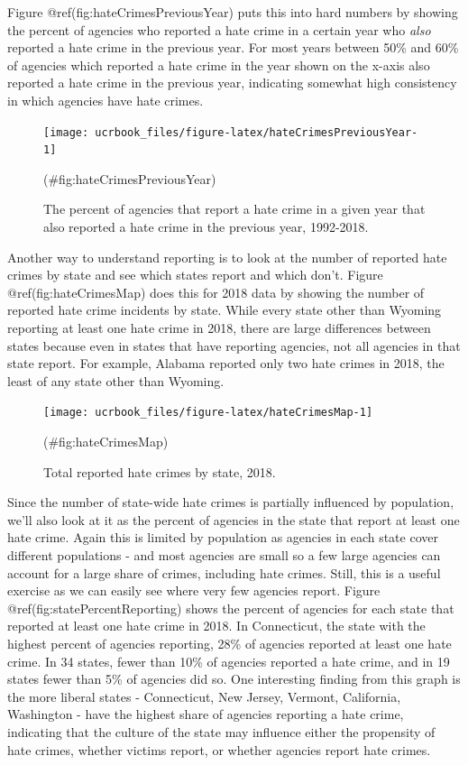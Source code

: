 \documentclass[
  12pt,
  openany]{book}
\begin{document}
Figure @ref(fig:hateCrimesPreviousYear) puts this into hard numbers by showing the percent of agencies who reported a hate crime in a certain year who \emph{also} reported a hate crime in the previous year. For most years between 50\% and 60\% of agencies which reported a hate crime in the year shown on the x-axis also reported a hate crime in the previous year, indicating somewhat high consistency in which agencies have hate crimes.

\begin{figure}

{\centering \texttt{[image: ucrbook\_files/figure-latex/hateCrimesPreviousYear-1]} 

}

\caption{The percent of agencies that report a hate crime in a given year that also reported a hate crime in the previous year, 1992-2018.}(\#fig:hateCrimesPreviousYear)
\end{figure}

Another way to understand reporting is to look at the number of reported hate crimes by state and see which states report and which don't. Figure @ref(fig:hateCrimesMap) does this for 2018 data by showing the number of reported hate crime incidents by state. While every state other than Wyoming reporting at least one hate crime in 2018, there are large differences between states because even in states that have reporting agencies, not all agencies in that state report. For example, Alabama reported only two hate crimes in 2018, the least of any state other than Wyoming.

\begin{figure}

{\centering \texttt{[image: ucrbook\_files/figure-latex/hateCrimesMap-1]} 

}

\caption{Total reported hate crimes by state, 2018.}(\#fig:hateCrimesMap)
\end{figure}

Since the number of state-wide hate crimes is partially influenced by population, we'll also look at it as the percent of agencies in the state that report at least one hate crime. Again this is limited by population as agencies in each state cover different populations - and most agencies are small so a few large agencies can account for a large share of crimes, including hate crimes. Still, this is a useful exercise as we can easily see where very few agencies report. Figure @ref(fig:statePercentReporting) shows the percent of agencies for each state that reported at least one hate crime in 2018. In Connecticut, the state with the highest percent of agencies reporting, 28\% of agencies reported at least one hate crime. In 34 states, fewer than 10\% of agencies reported a hate crime, and in 19 states fewer than 5\% of agencies did so. One interesting finding from this graph is the more liberal states - Connecticut, New Jersey, Vermont, California, Washington - have the highest share of agencies reporting a hate crime, indicating that the culture of the state may influence either the propensity of hate crimes, whether victims report, or whether agencies report hate crimes.
\end{document}
